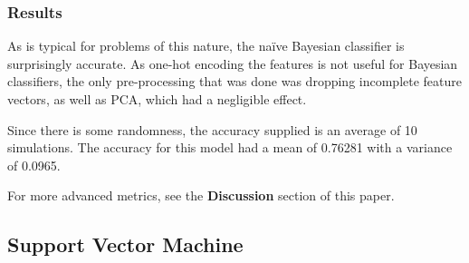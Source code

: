 \documentclass[12pt]{article}
\begin{document}
\subsubsection{Results}

As is typical for problems of this nature, the naïve Bayesian classifier is surprisingly accurate. As one-hot encoding the features is not useful for Bayesian classifiers, the only pre-processing that was done was dropping incomplete feature vectors, as well as PCA, which had a negligible effect.

Since there is some randomness, the accuracy supplied is an average of 10 simulations. The accuracy for this model had a mean of 0.76281 with a variance of 0.0965.

For more advanced metrics, see the \textbf{Discussion} section of this paper.

\subsection{Support Vector Machine}
\end{document}
